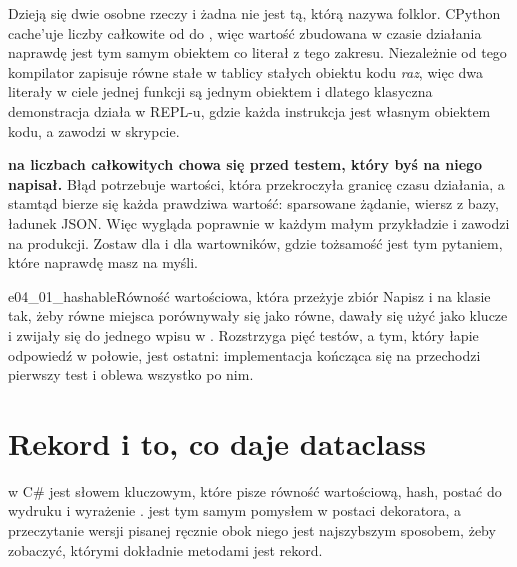 
\noindent
Dzieją się dwie osobne rzeczy i żadna nie jest tą, którą nazywa folklor.
CPython cache'uje liczby całkowite od  do , więc
wartość zbudowana w czasie działania naprawdę jest tym samym obiektem co
literał z tego zakresu. Niezależnie od tego kompilator zapisuje równe
stałe w tablicy stałych obiektu kodu \emph{raz}, więc dwa literały
 w ciele jednej funkcji są jednym obiektem \dash{} i dlatego
klasyczna demonstracja działa w REPL-u, gdzie każda instrukcja jest
własnym obiektem kodu, a zawodzi w skrypcie.

\begin{trapbox}
\textbf{ na liczbach całkowitych chowa się przed testem, który
byś na niego napisał.} Błąd potrzebuje wartości, która przekroczyła
granicę czasu działania, a stamtąd bierze się każda prawdziwa wartość:
sparsowane żądanie, wiersz z bazy, ładunek JSON. Więc  wygląda
poprawnie w każdym małym przykładzie i zawodzi na produkcji. Zostaw
 dla  i dla wartowników, gdzie tożsamość jest tym
pytaniem, które naprawdę masz na myśli.
\end{trapbox}

\begin{exercise}{e04_01_hashable}{Równość wartościowa, która przeżyje zbiór}
Napisz  i  na klasie  tak,
żeby równe miejsca porównywały się jako równe, dawały się użyć jako klucze
 i zwijały się do jednego wpisu w . Rozstrzyga pięć
testów, a tym, który łapie odpowiedź w połowie, jest ostatni:
implementacja kończąca się na  przechodzi pierwszy test i
oblewa wszystko po nim.
\end{exercise}

\section{Rekord i to, co daje dataclass}
\label{sec:ch04-dataclass}

 w C\# jest słowem kluczowym, które pisze równość
wartościową, hash, postać do wydruku i wyrażenie .
 jest tym samym pomysłem w postaci dekoratora, a
przeczytanie wersji pisanej ręcznie obok niego jest najszybszym sposobem,
żeby zobaczyć, którymi dokładnie metodami jest rekord.

